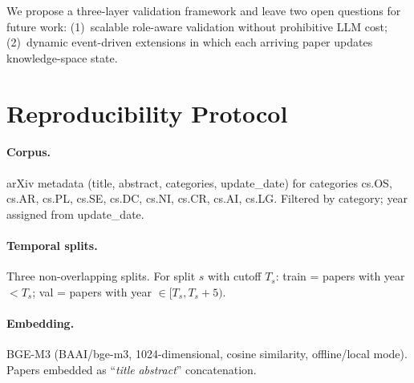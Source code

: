 \documentclass[11pt,twocolumn]{article}
\begin{document}
We propose a three-layer validation framework and leave two open questions for future
work: (1)~scalable role-aware validation without prohibitive LLM cost;
(2)~dynamic event-driven extensions in which each arriving paper updates knowledge-space
state.




\newpage
\appendix

\section{Reproducibility Protocol}
\label{app:protocol}

\paragraph{Corpus.}
arXiv metadata (title, abstract, categories, update\_date) for categories
cs.OS, cs.AR, cs.PL, cs.SE, cs.DC, cs.NI, cs.CR, cs.AI, cs.LG.
Filtered by category; year assigned from update\_date.

\paragraph{Temporal splits.}
Three non-overlapping splits. For split $s$ with cutoff $T_s$:
train = papers with year $< T_s$; val = papers with year $\in [T_s, T_s+5)$.

\begin{table}[h]
\centering\small
\caption{Temporal split parameters. $N$ approximate; exact t5 train $N{=}51{,}460$.}
\end{table}

\paragraph{Embedding.}
BGE-M3 (BAAI/bge-m3, 1024-dimensional, cosine similarity, offline/local mode).
Papers embedded as ``\textit{title} \textit{abstract}'' concatenation.
\end{document}
